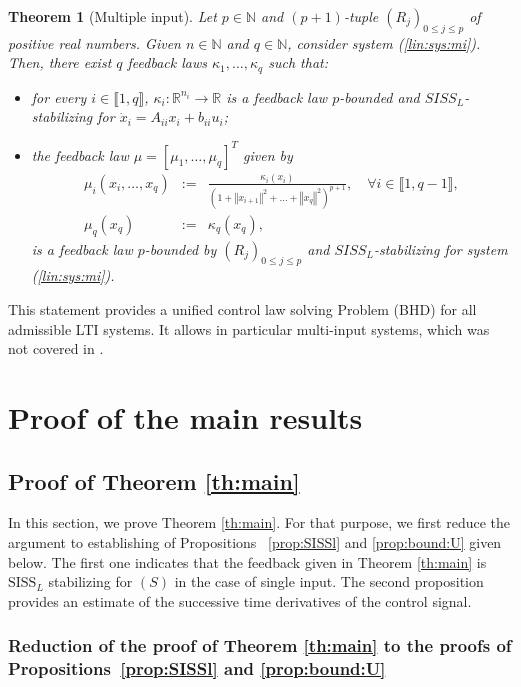 \documentclass[letterpaper, 10pt]{article}
\newtheorem{theo}{Theorem}
\newcommand{\rref}[1]{(\ref{#1})}
\newcommand{\norme}[1]{\left\Vert #1\right\Vert}
\newcommand{\reels}{\mathbb{R}}
\newcommand{\entiers}{\mathbb{N}}
\newcommand{\siss}{\text{SISS}}
\begin{document}
\begin{theo}[Multiple input]
\label{th:mi}
Let $p \in \entiers$ and $(p+1)$-tuple $(R_j)_{0 \leq j \leq p}$ of positive real numbers. Given $n \in \entiers$ and $q \in \entiers$, consider system \rref{lin:sys:mi}. Then, there exist $q$ feedback laws $\kappa_1, \ldots , \kappa_q$ such that:
\begin{itemize}
\item[i)] for every $i \in \llbracket 1, q \rrbracket$, $\kappa_i : \reels^{n_i} \to \reels$ is a feedback law $p$-bounded and $SISS_L$-stabilizing for $\dot{x}_i = A_{ii} x_i +b_{ii} u_i$;
\item[ii)] the feedback law $\mu=[\mu_1, \ldots , \mu_q]^T$ given by 
\begin{eqnarray}
\mu_i  (x_i, \ldots, x_q) & := & \frac{\kappa_i(x_i)}{(1 + \norme{x_{i+1}}^2 + \ldots + \norme{x_q}^2 )^{p+1}} , \quad \forall i \in \llbracket 1, q-1 \rrbracket, \\
\mu_q (x_q) & := & \kappa_q(x_q),
\end{eqnarray} 
is a feedback law $p$-bounded by $(R_j)_{0 \leq j \leq p}$ and $SISS_L$-stabilizing for system \rref{lin:sys:mi}.
\end{itemize}
\end{theo}

This statement provides a unified control law solving Problem (BHD) for all admissible LTI systems. It allows in particular multi-input systems, which was not covered in \cite{LCC1}.

\section{Proof of the main results}\label{sec:proofs}

\subsection{Proof of Theorem \ref{th:main}}
In this section, we prove Theorem \ref{th:main}. For that purpose, we first reduce the argument to establishing of Propositions ~\ref{prop:SISSl} and \ref{prop:bound:U} given below. The first one indicates that the feedback given in Theorem \ref{th:main} is $\siss_L$ stabilizing for $(S)$ in the case of single input. The second proposition provides an estimate of the successive time derivatives of the control signal.
\subsubsection{Reduction of the proof of Theorem \ref{th:main} to the proofs of Propositions~\ref{prop:SISSl} and \ref{prop:bound:U}}\label{sec:red:th1}
\end{document}
